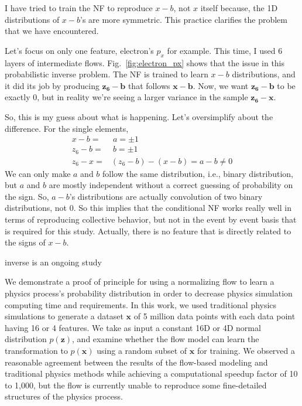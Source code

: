     
    I have tried to train the NF to reproduce $x-b$, not $x$ itself because, the 1D distributions of $x-b$'s are more symmetric. This practice clarifies the problem that we have encountered.
    
    Let's focus on only one feature, electron's $p_x$ for example. This time, I used 6 layers of intermediate flows. Fig.~\ref{fig:electron_px} shows that the issue in this probabilistic inverse problem.
    The NF is trained to learn $x-b$ distributions, and it did its job by producing $\mathbf{z_6}-\mathbf{b}$ that follows $\mathbf{x}-\mathbf{b}$. Now, we want $\mathbf{z_6}-\mathbf{b}$ to be exactly 0, but in reality we're seeing a larger variance in the sample $\mathbf{z_6}-\mathbf{x}$.
    
    So, this is my guess about what is happening. Let's oversimplify about the difference. For the single elements,
    \begin{align}
        x -b =& ~a = \pm 1\\
        z_6-b =& ~b = \pm 1\\
        z_6 -x =& (z_6-b) - (x-b) = a- b \neq 0
    \end{align}
    We can only make $a$ and $b$ follow the same distribution, i.e., binary distribution, but $a$ and $b$ are mostly independent without a correct guessing of probability on the sign. So, $a-b$'s distributions are actually convolution of two binary distributions, not 0. So this implies that the conditional NF works really well in terms of reproducing collective behavior, but not in the event by event basis that is required for this study. Actually, there is no feature that is directly related to the signs of $x-b$.
    
    
    
    inverse is an ongoing study
    
    We demonstrate a proof of principle for using a normalizing flow to learn a physics process's probability distribution in order to decrease physics simulation computing time and requirements. In this work, we used traditional physics simulations to generate a dataset $\mathbf{x}$ of 5 million data points with each data point having 16 or 4 features.  We take as input a constant 16D or 4D normal distribution $p(\mathbf{z})$, and examine whether the flow model can learn the transformation to $p(\mathbf{x})$ using a random subset of $\mathbf{x}$ for training. We observed a reasonable agreement between the results of the flow-based modeling and traditional physics methods while achieving a computational speedup factor of 10 to 1,000, but the flow is currently unable to reproduce some fine-detailed structures of the physics process.
    
    
    \parencite{Radhakrishnan2020OverparameterizedMemory}